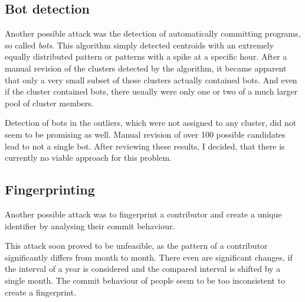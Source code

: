 \subsection{Bot detection}
Another possible attack was the detection of automatically committing programs, so called \emph{bots}.
This algorithm simply detected centroids with an extremely equally distributed pattern or patterns with a spike at a specific hour.
After a manual revision of the clusters detected by the algorithm, it became apparent that only a very small subset of those clusters actually contained bots.
And even if the cluster contained bots, there usually were only one or two of a much larger pool of cluster members.

Detection of bots in the outliers, which were not assigned to any cluster, did not seem to be promising as well.
Manual revision of over 100 possible candidates lead to not a single bot.
After reviewing these results, I decided, that there is currently no viable approach for this problem.


\subsection{Fingerprinting}
Another possible attack was to fingerprint a contributor and create a unique identifier by analysing their commit behaviour.

This attack soon proved to be unfeasible, as the pattern of a contributor significantly differs from month to month.
There even are significant changes, if the interval of a year is considered and the compared interval is shifted by a single month.
The commit behaviour of people seem to be too inconsistent to create a fingerprint.
